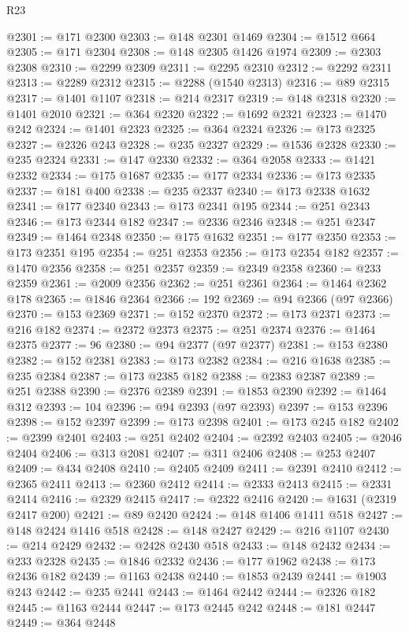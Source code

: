 \begin{lexlean}{R23}
\begin{coremodule}
@2301 := @171 @2300
@2303 := @148 @2301 @1469
@2304 := @1512 @664
@2305 := @171 @2304
@2308 := @148 @2305 @1426 @1974
@2309 := @2303 @2308
@2310 := @2299 @2309
@2311 := @2295 @2310
@2312 := @2292 @2311
@2313 := @2289 @2312
@2315 := @2288 (@1540 @2313)
@2316 := @89 @2315
@2317 := @1401 @1107
@2318 := @214 @2317
@2319 := @148 @2318
@2320 := @1401 @2010
@2321 := @364 @2320
@2322 := @1692 @2321
@2323 := @1470 @242
@2324 := @1401 @2323
@2325 := @364 @2324
@2326 := @173 @2325
@2327 := @2326 @243
@2328 := @235 @2327
@2329 := @1536 @2328
@2330 := @235 @2324
@2331 := @147 @2330
@2332 := @364 @2058
@2333 := @1421 @2332
@2334 := @175 @1687
@2335 := @177 @2334
@2336 := @173 @2335
@2337 := @181 @400
@2338 := @235 @2337
@2340 := @173 @2338 @1632
@2341 := @177 @2340
@2343 := @173 @2341 @195
@2344 := @251 @2343
@2346 := @173 @2344 @182
@2347 := @2336 @2346
@2348 := @251 @2347
@2349 := @1464 @2348
@2350 := @175 @1632
@2351 := @177 @2350
@2353 := @173 @2351 @195
@2354 := @251 @2353
@2356 := @173 @2354 @182
@2357 := @1470 @2356
@2358 := @251 @2357
@2359 := @2349 @2358
@2360 := @233 @2359
@2361 := @2009 @2356
@2362 := @251 @2361
@2364 := @1464 @2362 @178
@2365 := @1846 @2364
@2366 := 192
@2369 := @94 @2366 (@97 @2366)
@2370 := @153 @2369
@2371 := @152 @2370
@2372 := @173 @2371
@2373 := @216 @182
@2374 := @2372 @2373
@2375 := @251 @2374
@2376 := @1464 @2375
@2377 := 96
@2380 := @94 @2377 (@97 @2377)
@2381 := @153 @2380
@2382 := @152 @2381
@2383 := @173 @2382
@2384 := @216 @1638
@2385 := @235 @2384
@2387 := @173 @2385 @182
@2388 := @2383 @2387
@2389 := @251 @2388
@2390 := @2376 @2389
@2391 := @1853 @2390
@2392 := @1464 @312
@2393 := 104
@2396 := @94 @2393 (@97 @2393)
@2397 := @153 @2396
@2398 := @152 @2397
@2399 := @173 @2398
@2401 := @173 @245 @182
@2402 := @2399 @2401
@2403 := @251 @2402
@2404 := @2392 @2403
@2405 := @2046 @2404
@2406 := @313 @2081
@2407 := @311 @2406
@2408 := @253 @2407
@2409 := @434 @2408
@2410 := @2405 @2409
@2411 := @2391 @2410
@2412 := @2365 @2411
@2413 := @2360 @2412
@2414 := @2333 @2413
@2415 := @2331 @2414
@2416 := @2329 @2415
@2417 := @2322 @2416
@2420 := @1631 (@2319 @2417 @200)
@2421 := @89 @2420
@2424 := @148 @1406 @1411 @518
@2427 := @148 @2424 @1416 @518
@2428 := @148 @2427
@2429 := @216 @1107
@2430 := @214 @2429
@2432 := @2428 @2430 @518
@2433 := @148 @2432
@2434 := @233 @2328
@2435 := @1846 @2332
@2436 := @177 @1962
@2438 := @173 @2436 @182
@2439 := @1163 @2438
@2440 := @1853 @2439
@2441 := @1903 @243
@2442 := @235 @2441
@2443 := @1464 @2442
@2444 := @2326 @182
@2445 := @1163 @2444
@2447 := @173 @2445 @242
@2448 := @181 @2447
@2449 := @364 @2448

\end{coremodule}
\end{lexlean}
